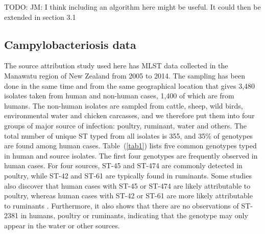 \documentclass[times, doublespace]{WileyNJD-v2}%
\begin{document}
TODO: JM: I think including an algorithm here might be useful. It could then be extended in section 3.1


\subsection{Campylobacteriosis data}

The source attribution study used here has MLST data collected in the Manawatu region of New Zealand from 2005 to 2014. The sampling has been done in the same time and from the same geographical location that gives 3,480 isolates taken from human and non-human cases, 1,400 of which are from humans. The non-human isolates are sampled from cattle, sheep, wild birds, environmental water and chicken carcasses, and we therefore put them into four groups of major source of infection: poultry, ruminant, water and others. The total number of unique ST typed from all isolates is 355, and 35\% of genotypes are found among human cases. Table~(\ref{tab1}) lists five common genotypes typed in human and source isolates. The first four genotypes are frequently observed in human cases. For four sources, ST-45 and ST-474 are commonly detected in poultry, while ST-42 and ST-61 are typically found in ruminants. Some studies also discover that human cases with ST-45 or ST-474 are likely attributable to poultry, whereas human cases with ST-42 or ST-61 are more likely attributable to ruminants \cite{Muell, Coll, Cart}. Furthermore, it also shows that there are no observations of ST-2381 in humans, poultry or ruminants, indicating that the genotype may only appear in the water or other sources.
\end{document}

